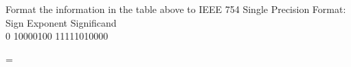 \documentclass[12pt]{article}
\begin{document}
\begin{center}
		Format the information in the table above to IEEE 754 Single Precision Format: \vspace{0.5cm} \\
		
		Sign \hspace{0.1cm}  Exponent \hspace{0.1cm} Significand  \vspace{0.2cm} \\
		
		0 \hspace{0.2cm} 10000100 \hspace{0.1cm} 11111010000 \vspace{0.5cm}
		
		= \vspace{0.4cm}\\
		
		 
		
		
	\end{center}
	
\end{document}
